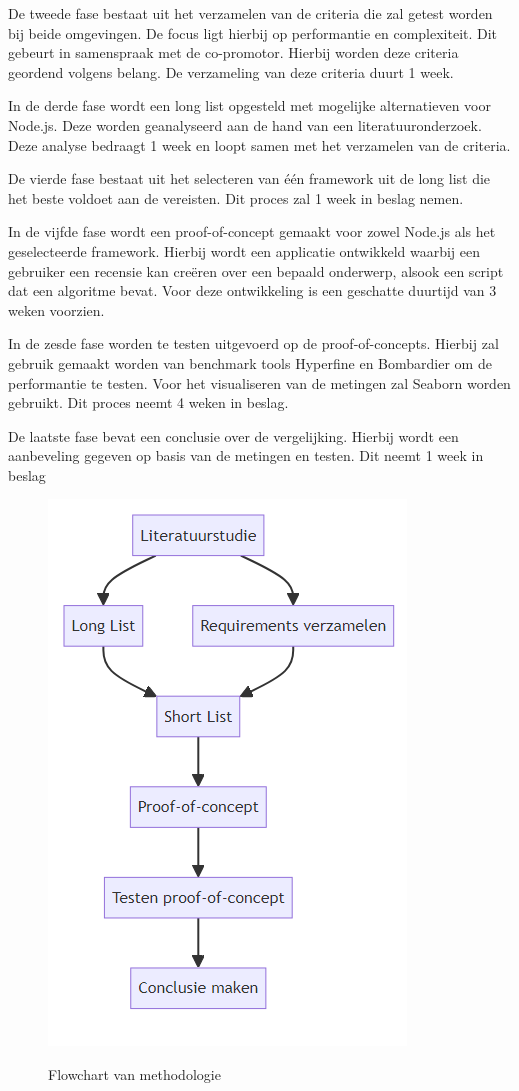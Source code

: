 De tweede fase bestaat uit het verzamelen van de criteria die zal getest worden bij beide omgevingen. 
De focus ligt hierbij op performantie en complexiteit.
Dit gebeurt in samenspraak met de co-promotor. Hierbij worden deze criteria geordend volgens belang. 
De verzameling van deze criteria duurt 1 week.

In de derde fase wordt een long list opgesteld met mogelijke alternatieven voor Node.js. 
Deze worden geanalyseerd aan de hand van een literatuuronderzoek. Deze analyse bedraagt 1 week en loopt samen met het verzamelen van de criteria.

De vierde fase bestaat uit het selecteren van één framework uit de long list die het beste voldoet aan de vereisten. 
Dit proces zal 1 week in beslag nemen.

In de vijfde fase wordt een proof-of-concept gemaakt voor zowel Node.js als het geselecteerde framework. 
Hierbij wordt een applicatie ontwikkeld waarbij een gebruiker een recensie kan creëren over een bepaald onderwerp, 
alsook een script dat een algoritme bevat.
Voor deze ontwikkeling is een geschatte duurtijd van 3 weken voorzien.

In de zesde fase worden te testen uitgevoerd op de proof-of-concepts. 
Hierbij zal gebruik gemaakt worden van benchmark tools Hyperfine en Bombardier om de performantie te testen.
Voor het visualiseren van de metingen zal Seaborn worden gebruikt.
Dit proces neemt 4 weken in beslag.

De laatste fase bevat een conclusie over de vergelijking. 
Hierbij wordt een aanbeveling gegeven op basis van de metingen en testen.
Dit neemt 1 week in beslag
\begin{figure}[h]
    \centering
    \includegraphics[width=.4\textwidth]{graphics/flowchart.png}
    \caption{\label{fig:flowchart}}Flowchart van methodologie
\end{figure}

